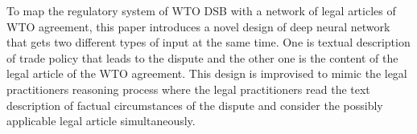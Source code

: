To map the regulatory system of WTO DSB with a network of legal articles of WTO agreement,
this paper introduces a novel design of deep neural network that
gets two different types of input at the same time.
One is textual description of trade policy that leads to the dispute and
the other one is the content of the legal article of the WTO agreement.
This design is improvised to mimic
the legal practitioners reasoning process
where the legal practitioners read
the text description of
factual circumstances of the dispute and consider the
possibly applicable legal article simultaneously.

 
 
 
 
 
 

